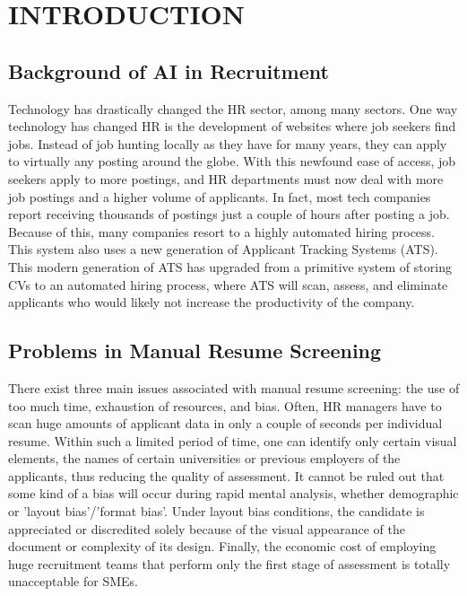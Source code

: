 \chapter{INTRODUCTION}

\section{Background of AI in Recruitment}
Technology has drastically changed the HR sector, among many sectors. One way technology has changed HR is the development of websites where job seekers find jobs. Instead of job hunting locally as they have for many years, they can apply to virtually any posting around the globe. With this newfound ease of access, job seekers apply to more postings, and HR departments must now deal with more job postings and a higher volume of applicants. In fact, most tech companies report receiving thousands of postings just a couple of hours after posting a job. Because of this, many companies resort to a highly automated hiring process. This system also uses a new generation of Applicant Tracking Systems (ATS). This modern generation of ATS has upgraded from a primitive system of storing CVs to an automated hiring process, where ATS will scan, assess, and eliminate applicants who would likely not increase the productivity of the company.

\section{Problems in Manual Resume Screening}
There exist three main issues associated with manual resume screening: the use of too much time, exhaustion of resources, and bias. Often, HR managers have to scan huge amounts of applicant data in only a couple of seconds per individual resume. Within such a limited period of time, one can identify only certain visual elements, the names of certain universities or previous employers of the applicants, thus reducing the quality of assessment. It cannot be ruled out that some kind of a bias will occur during rapid mental analysis, whether demographic or 'layout bias'/'format bias'. Under layout bias conditions, the candidate is appreciated or discredited solely because of the visual appearance of the document or complexity of its design. Finally, the economic cost of employing huge recruitment teams that perform only the first stage of assessment is totally unacceptable for SMEs.

